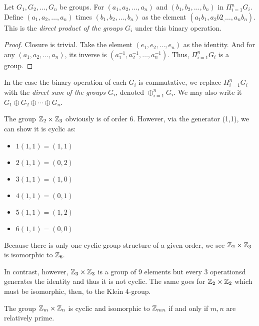 \begin{theorem}
    Let $G_1, G_2, \ldots, G_n$ be groups. For $(a_1, a_2, \ldots, a_n)$ and $(b_1,b_2, \ldots, b_n)$ in $\Pi_{i=1}^n G_i$. Define $(a_1,a_2,\ldots,a_n)$ times $(b_1,b_2,\ldots,b_n)$ as the element $(a_1b_1,a_2b2_,\ldots,a_nb_n).$ This is the \emph{direct product of the groups $G_i$} under this binary operation.
\end{theorem}
\begin{proof}
    Closure is trivial. Take the element $(e_1, e_2, \ldots, e_n)$ as the identity. And for any $(a_1, a_2, \ldots, a_n)$, its inverse is $(a_1^{-1}, a_2^{-1}, \ldots, a_n^{-1}).$ Thus, $\Pi_{i=1}^nG_i$ is a group.
\end{proof}
\begin{remark}
    In the case the binary operation of each $G_i$ is commutative, we replace $\Pi_{i=1}^n G_i$ with the \emph{direct sum of the groups $G_i$}, denoted $\oplus_{i=1}^nG_i$. We may also write it $G_1 \oplus G_2 \oplus \cdots \oplus G_n$.
\end{remark}
\begin{example}
    The group $\mathbb{Z}_2 \times \mathbb{Z}_3$ obviously is of order 6. However, via the generator (1,1), we can show it is cyclic as:\vspace{-15pt}
    \begin{multicols*}{3}\begin{itemize}
        \item $1(1,1) = (1,1)$
        \item $2(1,1) = (0,2)$
        \item $3(1,1) = (1,0)$
        \item $4(1,1) = (0,1)$
        \item $5(1,1) = (1,2)$
        \item $6(1,1) = (0,0)$
    \end{itemize}\end{multicols*}
    Because there is only one cyclic group structure of a given order, we see $\mathbb{Z}_2\times\mathbb{Z}_3$ is isomorphic to $\mathbb{Z}_6.$

    In contrast, however, $\mathbb{Z}_3 \times \mathbb{Z}_3$ is a group of 9 elements but every 3 operationsd generates the identity and thus it is not cyclic. The same goes for $\mathbb{Z}_2\times\mathbb{Z}_2$ which must be isomorphic, then, to the Klein 4-group.
\end{example}
\begin{theorem}
    The group $\mathbb{Z}_m\times\mathbb{Z}_n$ is cyclic and isomorphic to $\mathbb{Z}_{mn}$ if and only if $m,n$ are relatively prime.
\end{theorem}
